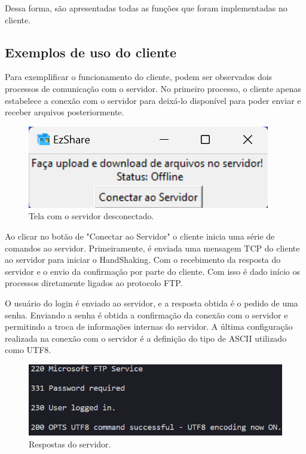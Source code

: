 \documentclass[11pt]{IEEEtran}
\begin{document}
Dessa forma, são apresentadas todas as funções que foram implementadas no cliente.

\subsection{Exemplos de uso do cliente}
Para exemplificar o funcionamento do cliente, podem ser observados dois processos de comunicação com o servidor. No primeiro processo, o cliente apenas estabelece a conexão com o servidor para deixá-lo disponível para poder enviar e receber arquivos posteriormente.

\begin{figure}[h]
   \centering
   \includegraphics[width = 0.8\linewidth]{TelaNaoConectado.png}  
   \caption{Tela com o servidor desconectado.}
   \label{fig:Tela inicial}
\end{figure}


Ao clicar no botão de "Conectar ao Servidor" o cliente inicia uma série de comandos ao servidor. Primeiramente, é enviada uma mensagem TCP do cliente ao servidor para iniciar o HandShaking. Com o recebimento da resposta do servidor e o envio da confirmação por parte do cliente. Com isso é dado início os processos diretamente ligados ao protocolo FTP.

O usuário do login é enviado ao servidor, e a resposta obtida é o pedido de uma senha. Enviando a senha é obtida a confirmação da conexão com o servidor e permitindo a troca de informações internas do servidor. A última configuração realizada na conexão com o servidor é a definição do tipo de ASCII utilizado como UTF8.

\begin{figure}[h]
   \centering
   \includegraphics[width = 0.9\linewidth]{RespostasConexao.png}  
   \caption{Respostas do servidor.}
   \label{fig:Respostas do servidor}
\end{figure}
\end{document}
